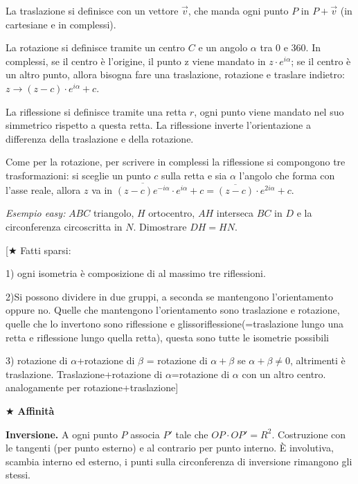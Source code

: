 La traslazione si definisce con un vettore $\vec{v}$, che manda ogni punto $P$ in $P+\vec{v}$ (in cartesiane e in complessi).

La rotazione si definisce tramite un centro $C$ e un angolo $\alpha$ tra 0 e 360.  In complessi, se il centro è l'origine, il punto z viene mandato in $z\cdot e^{i\alpha}$; se il centro è un altro punto, allora bisogna fare una traslazione, rotazione e traslare indietro: $z\rightarrow (z-c)\cdot e^{i\alpha}+c$.

La riflessione si definisce tramite una retta $r$, ogni punto viene mandato nel suo simmetrico rispetto a questa retta. La riflessione inverte l'orientazione a differenza della traslazione e della rotazione.

Come per la rotazione, per scrivere in complessi la riflessione si compongono tre trasformazioni: si sceglie un punto $c$ sulla retta e sia $\alpha$ l'angolo che forma con l'asse reale, allora $z$ va in $\overline{(z-c)e^{-i\alpha}}\cdot e^{i\alpha}+c=\overline{(z-c)}\cdot e^{2i\alpha}+c$.

\textit{Esempio easy:}  $ABC$ triangolo, $H$ ortocentro, $AH$ interseca $BC$ in $D$ e la circonferenza circoscritta in $N$. Dimostrare $DH=HN$.

\vspace{0.3cm}
[$\bigstar$ Fatti sparsi: 

1) ogni isometria è composizione di al massimo tre riflessioni.

2)Si possono dividere in due gruppi, a seconda se mantengono l'orientamento oppure no. Quelle che mantengono l'orientamento sono traslazione e rotazione, quelle che lo invertono sono riflessione e glissoriflessione(=traslazione lungo una retta e riflessione lungo quella retta), questa sono tutte le isometrie possibili

3) rotazione di $\alpha$+rotazione di $\beta$ = rotazione di $\alpha+\beta$ se $\alpha+\beta \neq 0$, altrimenti è traslazione. Traslazione+rotazione di $\alpha$=rotazione di $\alpha$ con un altro centro. analogamente per rotazione+traslazione]

\vspace{0.4cm}

$\bigstar$ \textbf{Affinità}

\vspace{0.4cm}

\textbf{Inversione.} A ogni punto $P$ associa $P'$ tale che $OP\cdot OP'=R^2$. Costruzione con le tangenti (per punto esterno) e al contrario per punto interno. È involutiva, scambia interno ed esterno, i punti sulla circonferenza di inversione rimangono gli stessi. 

